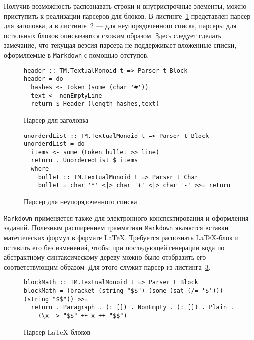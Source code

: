 Получив возможность распознавать строки и внутристрочные элементы, можно приступить к реализации парсеров для блоков. В листинге~\ref{listing:MarkdownHeader} представлен парсер для заголовка, а в листинге~\ref{listing:markdownUlist} --- для неупорядоченного списка, парсеры для остальных блоков описываются схожим образом. Здесь следует сделать замечание, что текущая версия парсера не поддерживает вложенные списки, оформляемые в \lstinline{Markdown} с помощью отступов.

\begin{figure}[t]
\begin{lstlisting}
header :: TM.TextualMonoid t => Parser t Block
header = do
  hashes <- token (some (char '#'))
  text <- nonEmptyLine
  return $ Header (length hashes,text)
\end{lstlisting}
\caption{Парсер для заголовка}
\label{listing:MarkdownHeader}
\end{figure}

\begin{figure}[t]
\begin{lstlisting}
unorderdList :: TM.TextualMonoid t => Parser t Block
unorderdList = do
  items <- some (token bullet >> line)
  return . UnorderedList $ items
  where
    bullet :: TM.TextualMonoid t => Parser t Char
    bullet = char '*' <|> char '+' <|> char '-' >>= return
\end{lstlisting}
\caption{Парсер для неупорядоченного списка}
\label{listing:markdownUlist}
\end{figure}

\lstinline{Markdown} применяется также для электронного конспектирования и оформления заданий. Полезным расширением грамматики \lstinline{Markdown} являются вставки матетических формул в формате \LaTeX. Требуется распознать \LaTeX-блок и оставить его без изменений, чтобы при последующей генерации кода по абстрактному синтаксическому дереву можно было отобразить его соответствующим образом. Для этого служит парсер из листинга~\ref{listing:MarkdownLaTeX}.

\begin{figure}[h]
\begin{lstlisting}
blockMath :: TM.TextualMonoid t => Parser t Block
blockMath = (bracket (string "$$") (some (sat (/= '$'))) (string "$$")) >>=
  return . Paragraph . (: []) . NonEmpty . (: []) . Plain .
    (\x -> "$$" ++ x ++ "$$")
\end{lstlisting}
\caption{Парсер \LaTeX-блоков}
\label{listing:MarkdownLaTeX}
\end{figure}

